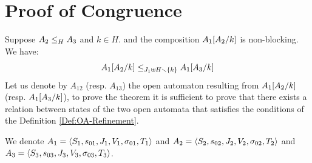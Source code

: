 \documentclass[runningheads]{llncs}
\begin{document}




\section{Proof of Congruence}
Suppose $\wrel{A_2}{A_3}{H}$ and  $k \in H$.  and the composition $A_1\subst{A_2}{k}$ is non-blocking. We have: \[\wrel{A_1\subst{A_2}{k}}{A_1\subst{A_3}{k}}{J_1 \uplus H \setminus \mbrc{k}}\]
\proof
Let us denote by $A_{12}$ (resp. $A_{13}$) the open automaton resulting from $A_1\subst{A_2}{k}$ (resp. $A_1\subst{A_3}{k}$),  to prove the theorem it is sufficient to prove that there exists a relation between states of the two open automata that satisfies the conditions of the Definition \ref{Def:OA-Refinement}. 

We denote $A_1=  \OA{S_1}{s_{01}}{J_1}{V_1}{\sigma_{01}}{T_1}$ and \(A_2 = \OA{S_2}{s_{02}}{J_2}{V_2}{\sigma_{02}}{T_2}\) and $A_3 = \OA{S_3}{s_{03}}{J_3}{V_3}{\sigma_{03}}{T_3}$.

\end{document}
